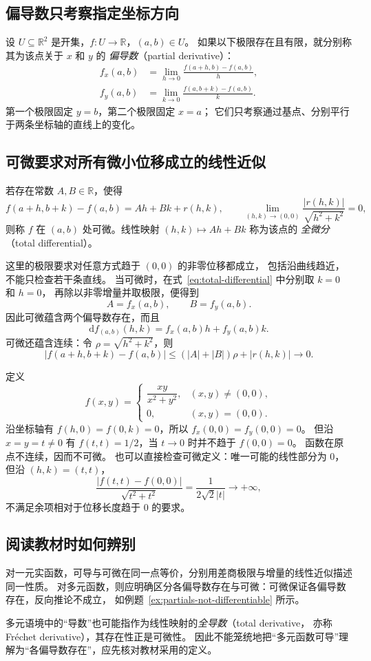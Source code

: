 \documentclass[UTF8,12pt,a4paper,fontset=fandol]{ctexart}
\begin{document}
\subsection{偏导数只考察指定坐标方向}

设 $U\subseteq\mathbb R^2$ 是开集，$f:U\to\mathbb R$，$(a,b)\in U$。
如果以下极限存在且有限，就分别称其为该点关于 $x$ 和 $y$ 的
\emph{偏导数}（partial derivative）：
\begin{align*}
  f_x(a,b)&=\lim_{h\to0}\frac{f(a+h,b)-f(a,b)}{h},\\
  f_y(a,b)&=\lim_{k\to0}\frac{f(a,b+k)-f(a,b)}{k}.
\end{align*}
第一个极限固定 $y=b$，第二个极限固定 $x=a$；
它们只考察通过基点、分别平行于两条坐标轴的直线上的变化。

\subsection{可微要求对所有微小位移成立的线性近似}

\begin{definition}[二元函数可微]
\label{def:total-differentiability}
若存在常数 $A,B\in\mathbb R$，使得
\begin{equation}\label{eq:total-differential}
  f(a+h,b+k)-f(a,b)=Ah+Bk+r(h,k),
  \qquad
  \lim_{(h,k)\to(0,0)}\frac{|r(h,k)|}{\sqrt{h^2+k^2}}=0,
\end{equation}
则称 $f$ 在 $(a,b)$ 处可微。线性映射 $(h,k)\mapsto Ah+Bk$ 称为该点的
\emph{全微分}（total differential）。
\end{definition}

这里的极限要求对任意方式趋于 $(0,0)$ 的非零位移都成立，
包括沿曲线趋近，不能只检查若干条直线。
当可微时，在式~\eqref{eq:total-differential} 中分别取 $k=0$ 和 $h=0$，
再除以非零增量并取极限，便得到
\[
  A=f_x(a,b),\qquad B=f_y(a,b).
\]
因此可微蕴含两个偏导数存在，而且
\[
  \mathrm df_{(a,b)}(h,k)=f_x(a,b)h+f_y(a,b)k.
\]
可微还蕴含连续：令 $\rho=\sqrt{h^2+k^2}$，则
\[
  |f(a+h,b+k)-f(a,b)|
  \le (|A|+|B|)\rho+|r(h,k)|\longrightarrow0.
\]

\begin{example}
\label{ex:partials-not-differentiable}
定义
\[
  f(x,y)=
  \begin{cases}
    \dfrac{xy}{x^2+y^2},&(x,y)\ne(0,0),\\
    0,&(x,y)=(0,0).
  \end{cases}
\]
沿坐标轴有 $f(h,0)=f(0,k)=0$，所以 $f_x(0,0)=f_y(0,0)=0$。
但沿 $x=y=t\ne0$ 有 $f(t,t)=1/2$，当 $t\to0$ 时并不趋于 $f(0,0)=0$。
函数在原点不连续，因而不可微。
也可以直接检查可微定义：唯一可能的线性部分为 $0$，但沿 $(h,k)=(t,t)$，
\[
  \frac{|f(t,t)-f(0,0)|}{\sqrt{t^2+t^2}}
  =\frac{1}{2\sqrt{2}|t|}\longrightarrow+\infty,
\]
不满足余项相对于位移长度趋于 $0$ 的要求。
\end{example}

\subsection{阅读教材时如何辨别}

对一元实函数，可导与可微在同一点等价，分别用差商极限与增量的线性近似描述同一性质。
对多元函数，则应明确区分各偏导数存在与可微：可微保证各偏导数存在，反向推论不成立，
如例题~\ref{ex:partials-not-differentiable} 所示。

多元语境中的“导数”也可能指作为线性映射的\emph{全导数}（total derivative，
亦称 Fr\'{e}chet derivative），其存在性正是可微性。
因此不能笼统地把“多元函数可导”理解为“各偏导数存在”，应先核对教材采用的定义。
\end{document}
